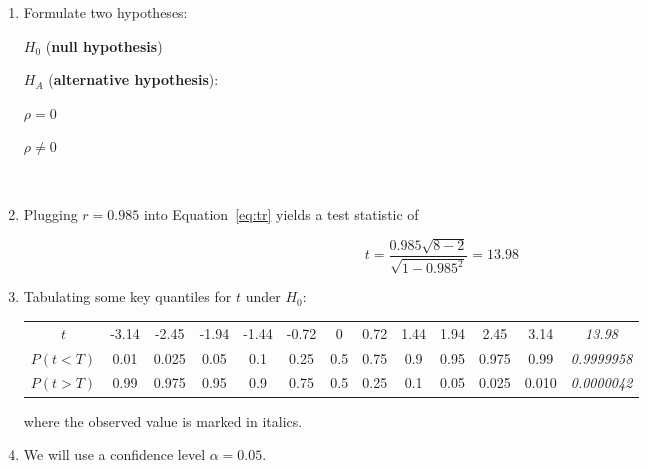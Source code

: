 \begin{enumerate}
\item Formulate two hypotheses:

  \noindent\begin{minipage}{.4\textwidth}
  $H_0$ (\textbf{null hypothesis})
  
  \vspace{1em}
  
  $H_{\!A}$ (\textbf{alternative hypothesis}):
\end{minipage}
\begin{minipage}{.2\textwidth}
\end{minipage}
\begin{minipage}{.2\textwidth}
  $\rho=0$
  
  \vspace{1em}
  
  $\rho\neq{0}$
\end{minipage}
\begin{minipage}{.2\textwidth}
\end{minipage}\\

\item Plugging $r = 0.985$ into Equation~\ref{eq:tr} yields a test
  statistic of

  \[
  t = \frac{0.985\sqrt{8-2}}{\sqrt{1-0.985^2}} = 13.98
  \]

\item Tabulating some key quantiles for $t$ under $H_0$:
  
  \begin{center}
    \begin{tabular}{c|c@{\gap}c@{\gap}c@{\gap}c@{\gap}
        c@{\gap}c@{\gap}c@{\gap}c@{\gap}c@{\gap}c@{\gap}c@{\gap}c}
      $t$ & -3.14 & -2.45 & -1.94 & -1.44 & -0.72 &
      0 & 0.72 & 1.44 & 1.94 & 2.45 & 3.14 & \emph{13.98}\\
      $P(t<T)$ & 0.01 & 0.025 & 0.05 & 0.1 & 0.25 &
      0.5 & 0.75 & 0.9 & 0.95 & 0.975 & 0.99 & \emph{0.9999958}\\
      $P(t>T)$ & 0.99 & 0.975 & 0.95 & 0.9 & 0.75 & 0.5 &
      0.25 & 0.1 & 0.05 & 0.025 & 0.010 & \emph{0.0000042}
    \end{tabular}
  \end{center}

  \noindent where the observed value is marked in italics.
  
\item We will use a confidence level $\alpha = 0.05$.


\end{enumerate}
